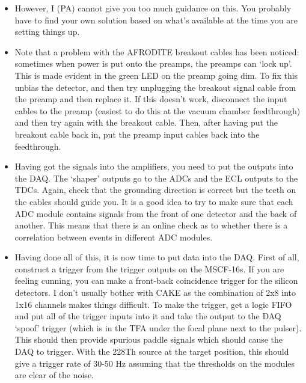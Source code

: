 \documentclass[11pt]{report}
\begin{document}
\begin{itemize}

\item However, I (PA) cannot give you too much guidance on this. You probably have to find your own solution based on what’s available at the time you are setting things up.

\item Note that a problem with the AFRODITE breakout cables has been noticed: sometimes when power is put onto the preamps, the preamps can \textquoteleft lock up\textquoteright. This is made evident in the green LED on the preamp going dim. To fix this unbias the detector, and then try unplugging the breakout signal cable from the preamp and then replace it. If this doesn’t work, disconnect the input cables to the preamp (easiest to do this at the vacuum chamber feedthrough) and then try again with the breakout cable. Then, after having put the breakout cable back in, put the preamp input cables back into the feedthrough.

\item Having got the signals into the amplifiers, you need to put the outputs into the DAQ. The ‘shaper’ outputs go to the ADCs and the ECL outputs to the TDCs. Again, check that the grounding direction is correct but the teeth on the cables should guide you. It is a good idea to try to make sure that each ADC module contains signals from the front of one detector and the back of another. This means that there is an online check as to whether there is a correlation between events in different ADC modules.

\item Having done all of this, it is now time to put data into the DAQ. First of all, construct a trigger from the trigger outputs on the MSCF-16s. If you are feeling cunning, you can make a front-back coincidence trigger for the silicon detectors. I don’t usually bother with CAKE as the combination of 2x8 into 1x16 channels makes things difficult. To make the trigger, get a logic FIFO and put all of the trigger inputs into it and take the output to the DAQ ‘spoof’ trigger (which is in the TFA under the focal plane next to the pulser). This should then provide spurious paddle signals which should cause the DAQ to trigger. With the 228Th source at the target position, this should give a trigger rate of 30-50 Hz assuming that the thresholds on the modules are clear of the noise.


\end{itemize}
\end{document}
